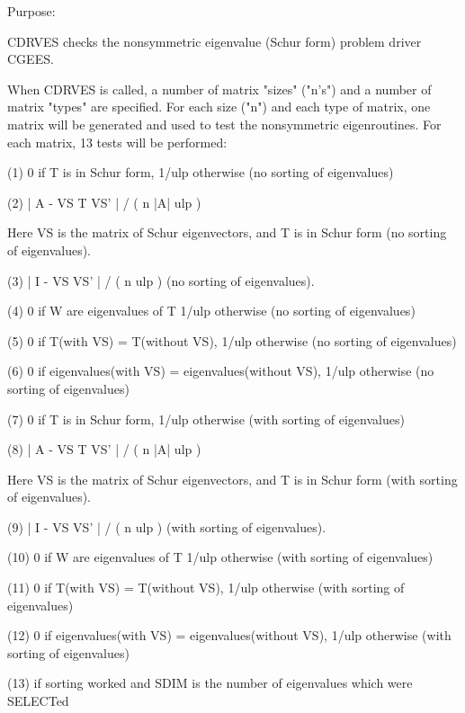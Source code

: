 \begin{DoxyParagraph}{Purpose\+: }
\begin{DoxyVerb}    CDRVES checks the nonsymmetric eigenvalue (Schur form) problem
    driver CGEES.

    When CDRVES is called, a number of matrix "sizes" ("n's") and a
    number of matrix "types" are specified.  For each size ("n")
    and each type of matrix, one matrix will be generated and used
    to test the nonsymmetric eigenroutines.  For each matrix, 13
    tests will be performed:

    (1)     0 if T is in Schur form, 1/ulp otherwise
           (no sorting of eigenvalues)

    (2)     | A - VS T VS' | / ( n |A| ulp )

      Here VS is the matrix of Schur eigenvectors, and T is in Schur
      form  (no sorting of eigenvalues).

    (3)     | I - VS VS' | / ( n ulp ) (no sorting of eigenvalues).

    (4)     0     if W are eigenvalues of T
            1/ulp otherwise
            (no sorting of eigenvalues)

    (5)     0     if T(with VS) = T(without VS),
            1/ulp otherwise
            (no sorting of eigenvalues)

    (6)     0     if eigenvalues(with VS) = eigenvalues(without VS),
            1/ulp otherwise
            (no sorting of eigenvalues)

    (7)     0 if T is in Schur form, 1/ulp otherwise
            (with sorting of eigenvalues)

    (8)     | A - VS T VS' | / ( n |A| ulp )

      Here VS is the matrix of Schur eigenvectors, and T is in Schur
      form  (with sorting of eigenvalues).

    (9)     | I - VS VS' | / ( n ulp ) (with sorting of eigenvalues).

    (10)    0     if W are eigenvalues of T
            1/ulp otherwise
            (with sorting of eigenvalues)

    (11)    0     if T(with VS) = T(without VS),
            1/ulp otherwise
            (with sorting of eigenvalues)

    (12)    0     if eigenvalues(with VS) = eigenvalues(without VS),
            1/ulp otherwise
            (with sorting of eigenvalues)

    (13)    if sorting worked and SDIM is the number of
            eigenvalues which were SELECTed


\end{DoxyVerb}
\end{DoxyParagraph}
